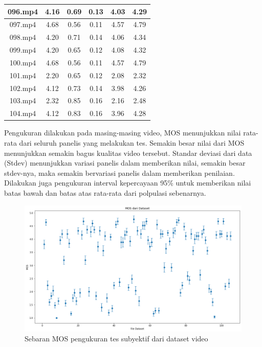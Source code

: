 \begin{table}[H]
\begin{tabular}{|c|c|c|c|c|c|}
			096.mp4 & 4.16 & 0.69  & 0.13      & 4.03         & 4.29        \\ \hline
			097.mp4 & 4.68 & 0.56  & 0.11      & 4.57         & 4.79        \\ \hline
			098.mp4 & 4.20 & 0.71  & 0.14      & 4.06         & 4.34        \\ \hline
			099.mp4 & 4.20 & 0.65  & 0.12      & 4.08         & 4.32        \\ \hline
			100.mp4 & 4.68 & 0.56  & 0.11      & 4.57         & 4.79        \\ \hline
			101.mp4 & 2.20 & 0.65  & 0.12      & 2.08         & 2.32        \\ \hline
			102.mp4 & 4.12 & 0.73  & 0.14      & 3.98         & 4.26        \\ \hline
			103.mp4 & 2.32 & 0.85  & 0.16      & 2.16         & 2.48        \\ \hline
			104.mp4 & 4.12 & 0.83  & 0.16      & 3.96         & 4.28        \\ \hline
		\end{tabular}
\end{table}

Pengukuran dilakukan pada masing-masing video, MOS menunjukkan nilai rata-rata dari seluruh panelis yang melakukan tes. Semakin besar nilai dari MOS menunjukkan semakin bagus kualitas video tersebut. Standar deviasi dari data (Stdev) menunjukkan variasi panelis dalam memberikan nilai, semakin besar stdev-nya, maka semakin bervariasi panelis dalam memberikan penilaian. Dilakukan juga pengukuran interval kepercayaan 95\% untuk memberikan nilai batas bawah dan batas atas rata-rata dari polpulasi sebenarnya. 

\begin{figure}[H]
	\vspace{-0.1cm}
	\begin{center}
		\includegraphics[width=1\columnwidth]{bab4/Gambar/sebaran-tes.png}
	\end{center}
	\vspace{-0.2cm}
	\caption{Sebaran MOS pengukuran tes subyektif dari dataset video}
	\label{sebaran-tes}
\end{figure}

